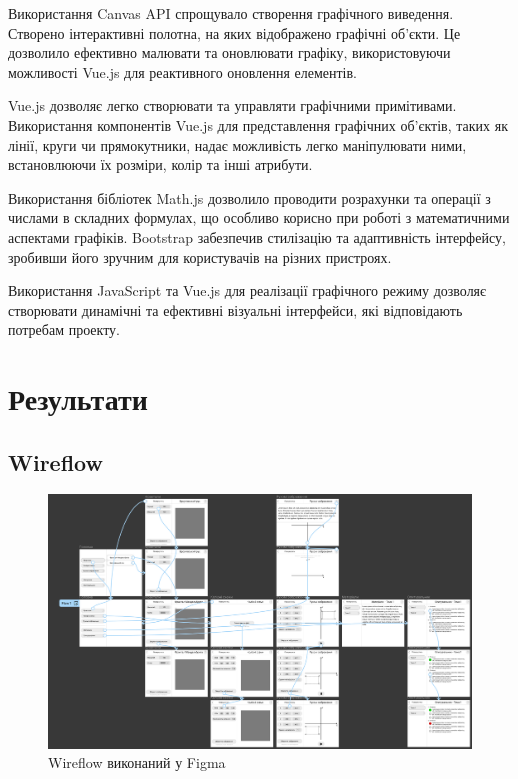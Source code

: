 \documentclass[oneside,14pt]{extarticle}
\begin{document}
\begin{normalsize}
	Використання Canvas API спрощувало створення графічного виведення. Створено інтерактивні полотна, на яких відображено графічні об'єкти. Це дозволило ефективно малювати та оновлювати графіку, використовуючи можливості Vue.js для реактивного оновлення елементів.
	
	Vue.js дозволяє легко створювати та управляти графічними примітивами. Використання компонентів Vue.js для представлення графічних об'єктів, таких як лінії, круги чи прямокутники, надає можливість легко маніпулювати ними, встановлюючи їх розміри, колір та інші атрибути.
	
	Використання бібліотек Math.js дозволило проводити розрахунки та операції з числами в складних формулах, що особливо корисно при роботі з математичними аспектами графіків. Bootstrap забезпечив стилізацію та адаптивність інтерфейсу, зробивши його зручним для користувачів на різних пристроях.
	
	Використання JavaScript та Vue.js для реалізації графічного режиму дозволяє створювати динамічні та ефективні візуальні інтерфейси, які відповідають потребам проекту.
	\section{Результати}
	\subsection{Wireflow}
	\begin{figure}[H]
		\centering
		\includegraphics[scale=0.45]{wireflow}
		\caption{Wireflow виконаний у Figma}
	\end{figure}
	

\end{normalsize}
\end{document}
